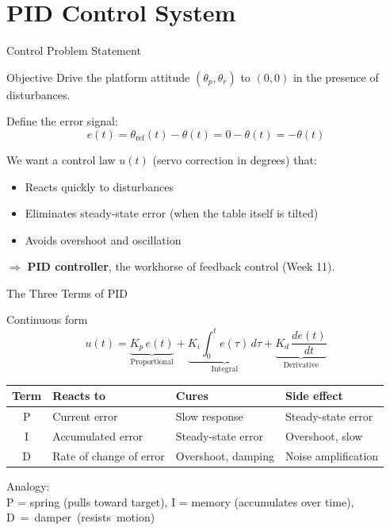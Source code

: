 \documentclass[10pt]{beamer}
\begin{document}
\section{PID Control System}

\begin{frame}{Control Problem Statement}
  \begin{block}{Objective}
    Drive the platform attitude $(\theta_p, \theta_r)$ to $(0, 0)$ in the presence of disturbances.
  \end{block}

  Define the error signal:
  \[
    e(t) = \theta_{\text{ref}}(t) - \theta(t) = 0 - \theta(t) = -\theta(t)
  \]

  We want a control law $u(t)$ (servo correction in degrees) that:
  \begin{itemize}
    \item Reacts quickly to disturbances
    \item Eliminates steady-state error (when the table itself is tilted)
    \item Avoids overshoot and oscillation
  \end{itemize}

  $\Rightarrow$ \textbf{PID controller}, the workhorse of feedback control (Week 11).
\end{frame}

\begin{frame}{The Three Terms of PID}
  \begin{block}{Continuous form}
    \[
      u(t) = \underbrace{K_p\, e(t)}_{\text{Proportional}}
           + \underbrace{K_i \int_0^t e(\tau)\,d\tau}_{\text{Integral}}
           + \underbrace{K_d\, \frac{de(t)}{dt}}_{\text{Derivative}}
    \]
  \end{block}

  \footnotesize
  \begin{tabular}{c|p{3.2cm}|p{3.2cm}|p{2.5cm}}
    \toprule
    Term & Reacts to & Cures & Side effect \\
    \midrule
    P & Current error & Slow response & Steady-state error \\
    I & Accumulated error & Steady-state error & Overshoot, slow \\
    D & Rate of change of error & Overshoot, damping & Noise amplification \\
    \bottomrule
  \end{tabular}

  \vspace{0.4cm}
  Analogy:\\
  P = spring (pulls toward target),\quad
  I = memory (accumulates over time),\quad
  D~=~damper~(resists~motion)

\end{frame}
\end{document}
